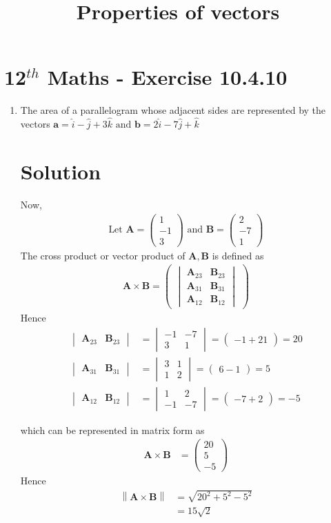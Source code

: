 \documentclass[12pt]{article}
\newcommand{\mydet}[1]{\ensuremath{\begin{vmatrix}#1\end{vmatrix}}}
\providecommand{\norm}[1]{\left\lVert#1\right\rVert}
\newcommand{\myvec}[1]{\ensuremath{\begin{pmatrix}#1\end{pmatrix}}}
\let\vec\mathbf
\begin{document}
\begin{center}
\title{\textbf{Properties of vectors}}
\date{\vspace{-5ex}} %
\maketitle
\end{center}
\setcounter{page}{1}
\section{12$^{th}$ Maths - Exercise 10.4.10}

\begin{enumerate}
\item The area of a parallelogram whose adjacent sides are represented by the vectors $\vec{a}=\hat{i}-\hat{j}+3\hat{k}\text{ and } \vec{b}=2\hat{i}-7\hat{j}+\hat{k}$
\section{Solution}
Now,
\begin{align}
\text{Let } \vec{A} = \myvec{1\\-1\\3} \text{ and } \vec{B} = \myvec{2\\ -7 \\ 1}
\end{align}
The cross product or vector product of $\vec{A},\vec{B}$ is defined as
\begin{align}
	\vec{A} \times \vec{B} = \myvec{\mydet{\vec{A}_{23}&\vec{B}_{23}\\\vec{A}_{31}&\vec{B}_{31}\\\vec{A}_{12}&\vec{B}_{12}}}
\end{align}
Hence
\begin{align}
	\mydet{\vec{A}_{23}&\vec{B}_{23}}&=\mydet{-1&-7\\3&1}=\myvec{-1+21}=20\\
	\mydet{\vec{A}_{31}&\vec{B}_{31}}&=\mydet{3&1\\1&2}=\myvec{6-1}=5\\
	\mydet{\vec{A}_{12}&\vec{B}_{12}}&=\mydet{1&2\\-1&-7}=\myvec{-7+2}=-5
\end{align}

which can be represented in matrix form as
\begin{align}
	\vec{A} \times \vec{B}&=\myvec{20\\5\\-5}
\end{align}
Hence
\begin{align}
\norm{\vec{A} \times \vec{B}}&=\sqrt{20^2+5^2-5^2}\\
 &= 15\sqrt{2}
\end{align}

\end{enumerate}
\end{document}
